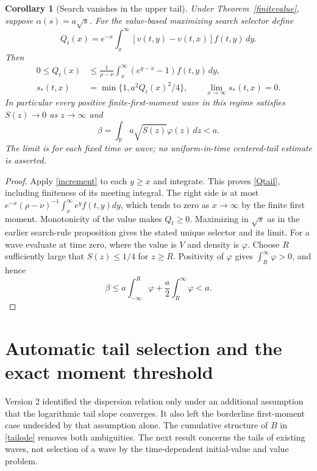 \documentclass[11pt]{article}
\newtheorem{corollary}[theorem]{Corollary}
\newcommand{\R}{\mathbb R}
\begin{document}
\begin{corollary}[Search vanishes in the upper tail]\label{vanishingsearch}
Under Theorem~\ref{finitevalue}, suppose $\alpha(s)=a\sqrt{s}$.
For the value-based maximizing search selector define
\[
 Q_t(x)=e^{-x}\int_x^\infty[v(t,y)-v(t,x)]f(t,y)\,dy.
\]
Then
\begin{align}
 0\leq Q_t(x)&\leq\frac1{\rho-\nu}
       \int_x^\infty(e^{y-x}-1)f(t,y)\,dy,\label{Qtail}\\
 s_*(t,x)&=\min\{1,a^2Q_t(x)^2/4\},\qquad
           \lim_{x\to\infty}s_*(t,x)=0.\nonumber
\end{align}
In particular every positive finite-first-moment wave in this regime
satisfies $S(z)\to0$ as $z\to\infty$ and
\[
 \beta=\int_\R a\sqrt{S(z)}\varphi(z)\,dz<a.
\]
The limit is for each fixed time or wave; no uniform-in-time centered-tail
estimate is asserted.
\end{corollary}
\begin{proof}
Apply \eqref{increment} to each $y\geq x$ and integrate. This proves
\eqref{Qtail}, including finiteness of its meeting integral. The right
side is at most
$e^{-x}(\rho-\nu)^{-1}\int_x^\infty e^yf(t,y)dy$, which tends to zero
as $x\to\infty$ by the finite first moment. Monotonicity of the value
makes $Q_t\geq0$. Maximizing in $\sqrt{s}$ as in the earlier search-rule
proposition gives the stated unique selector and its limit.
For a wave evaluate at time zero, where the value is $V$ and density is
$\varphi$. Choose $R$ sufficiently large that $S(z)\leq1/4$ for
$z\geq R$. Positivity of $\varphi$ gives
$\int_R^\infty\varphi>0$, and hence
\[
 \beta\leq a\int_{-\infty}^R\varphi
           +\frac a2\int_R^\infty\varphi<a.
\]
\end{proof}

\section{Automatic tail selection and the exact moment threshold}
Version 2 identified the dispersion relation only under an additional
assumption that the logarithmic tail slope converges. It also left the
borderline first-moment case undecided by that assumption alone. The
cumulative structure of $B$ in \eqref{tailode} removes both ambiguities.
The next result concerns the tails of existing waves, not selection of a
wave by the time-dependent initial-value and value problem.
\end{document}

